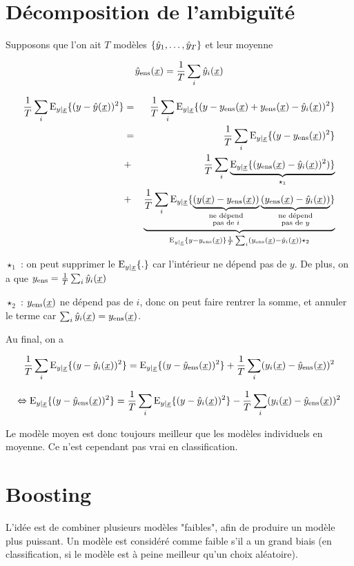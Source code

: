 	
\section{Décomposition de l'ambiguïté}

Supposons que l'on ait $T$ modèles $\ens{\yh_1, \dots , \yh_T}$ et leur moyenne

$$\yhens(\xu) = \frac{1}{T} \sum_i \yh_i(\xu)$$

\begin{eqnarray*}
\frac{1}{T} \sum_i \eyx{(y - \yh(\xu))^2} & = & \frac{1}{T} \sum_i \eyx{(y - \yens(\xu) + \yens(\xu) - \yh_i(\xu))^2} \\
& = & \frac{1}{T} \sum_i \eyx{(y - \yens(\xu))^2} \\
& + & \frac{1}{T} \sum_i \underbrace{\eyx{(\yens(\xu) - \yh_i(\xu))^2)}}_{\star_1} \\
& + & \underbrace{\frac{1}{T} \sum_i \eyx{\underbrace{(y(\xu) - \yens(\xu))}_{\substack{\text{ne dépend} \\ \text{pas de }i}}
\underbrace{(\yens(\xu) - \yh_i(\xu))}_{\substack{\text{ne dépend} \\
 \text{pas de } y}}}}_{\eyx{y - \yens(\xu)}\frac{1}{T} \sum_i (\yens(\xu) - \yh_i(\xu)) \star_2} \\
\end{eqnarray*}
 
 $\star_1$ : on peut supprimer le $\eyx{.}$ car l'intérieur ne dépend pas de $y$. De plus, on a que $\yens = \frac{1}{T} \sum_i \yh_i(\xu)$
 
 $\star_2$ : $\yens(\xu)$ ne dépend pas de $i$, donc on peut faire rentrer la somme, et annuler le terme car $\sum_i \yh_i(\xu) = \yens(\xu)$.
 
 Au final, on a

$$\frac{1}{T}\sum_i \eyx{(y - \yh_i(\xu))^2} = \eyx{(y - \yhens(\xu))^2} + \frac{1}{T} \sum_i (y_i(\xu) - \yhens(\xu))^2$$

$$\Leftrightarrow \eyx{(y - \yhens(\xu))^2} = \frac{1}{T}\sum_i \eyx{(y - \yh_i(\xu))^2} - \frac{1}{T} \sum_i (y_i(\xu) - \yhens(\xu))^2$$

Le modèle moyen est donc toujours meilleur que les modèles individuels en moyenne. Ce n'est cependant pas vrai en classification.
	
\section{Boosting}
	
L'idée est de combiner plusieurs modèles "faibles", afin de produire un modèle plus puissant. Un modèle est considéré comme faible s'il a un grand biais (en classification, si le modèle est à peine meilleur qu'un choix aléatoire).

